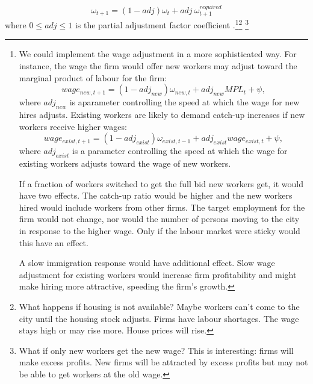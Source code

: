 \documentclass[]{article}
\begin{document}
\begin{equation}
\omega_{t+1}= (1-adj)\omega_{t} + adj\ \omega^{required}_{t+1}
\end{equation}
where $0\le adj \le 1$ is the partial adjustment factor coefficient
.\footnote{We could implement the wage adjustment in a more sophisticated way. For instance, the wage the firm would offer new workers may adjust toward the marginal product of labour for the firm: %
\begin{equation}wage_{new,t+1}= (1-adj_{new})\omega_{new,t} + adj_{new} MPL_{t}  +\psi, \end{equation}
where $adj_{new}$ is aparameter controlling the speed at which the wage for new hires adjusts. 
Existing workers are likely to demand catch-up increases if new workers receive higher wages:
\begin{equation} wage_{exist,t+1}= (1-adj_{exist}) \omega_{exist, t-1} + adj_{exist} wage_{exist,t}  +\psi, \end{equation}
where $adj_{exist}$ is a parameter controlling the speed at which the wage for existing workers adjusts toward the wage of new workers.

If a fraction of workers switched to get the full bid new workers get, it would have two effects. The catch-up ratio would be higher and the new workers hired would include workers from other firms. The target employment for the firm would not change, nor would the number of persons moving to the city in response to the higher wage. Only if the labour market were sticky would this have an effect.

A slow immigration response would have additional effect.
Slow wage adjustment for existing workers would increase firm profitability and might make hiring more attractive, speeding the firm's growth.}\footnote{What happens if housing is not available? Maybe workers can't come to the city until the housing stock adjusts. Firms have labour shortages.  The wage stays high or may rise more. House prices will rise.} \footnote{What if only new workers get the new wage? This is interesting: firms will make excess profits. New firms will be attracted by excess profits but may not be able to get workers at the old wage.}
\end{document}
